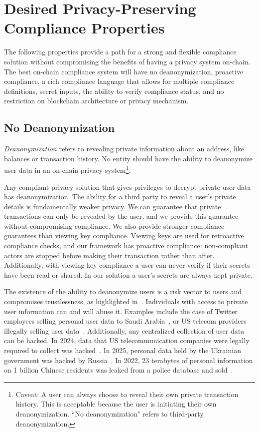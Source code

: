 \documentclass[9pt]{extreport}
\begin{document}
\chapter{Desired Privacy-Preserving Compliance Properties}
\label{sec:privacy-preserving-compliance}
The following properties provide a path for a strong and flexible compliance solution without compromising the benefits of having a privacy system on-chain.  The best on-chain compliance system will have no deanonymization, proactive compliance, a rich compliance language that allows for multiple compliance definitions, secret inputs, the ability to verify compliance status, and no restriction on blockchain architecture or privacy mechanism.

\section{No Deanonymization}
\label{sec:deanon}
\textit{Deanonymization} refers to revealing private information about an address, like balances or transaction history.  No entity should have the ability to deanonymize user data in an on-chain privacy system\footnote{Caveat: A user can always choose to reveal their own private transaction history.  This is acceptable because the user is initiating their own deanonymization.  ``No deanonymization" refers to third-party deanonymization.}.

Any compliant privacy solution that gives privileges to decrypt private user data has deanonymization.  The ability for a third party to reveal a user's private details is fundamentally weaker privacy.  We can guarantee that private transactions can only be revealed by the user, and we provide this guarantee without compromising compliance.  We also provide stronger compliance guarantees than viewing key compliance.  Viewing keys are used for retroactive compliance checks, and our framework has proactive compliance: non-compliant actors are stopped before making their transaction rather than after.  Additionally, with viewing key compliance a user can never verify if their secrets have been read or shared.  In our solution a user's secrets are always kept private.

The existence of the ability to deanonymize users is a risk vector to users and compromises trustlessness, as highlighted in~\cite{a16z_zkp_privacy_2022}.  Individuals with access to private user information can and will abuse it.  Examples include the case of Twitter employees selling personal user data to Saudi Arabia~\cite{newman2019twitter, collier2022twitter}, or US telecom providers illegally selling user data~\cite{daws2024fcc}.  Additionally, any centralized collection of user data can be hacked.  In 2024, data that US telecommunication companies were legally required to collect was hacked~\cite{sakellariadis2024china}.  In 2025, personal data held by the Ukrainian government was hacked by Russia~\cite{post2025ukraine}.  In 2022, 23 terabytes of personal information on 1 billion Chinese residents was leaked from a police database and sold~\cite{wikipedia2025shanghai}.
\end{document}
